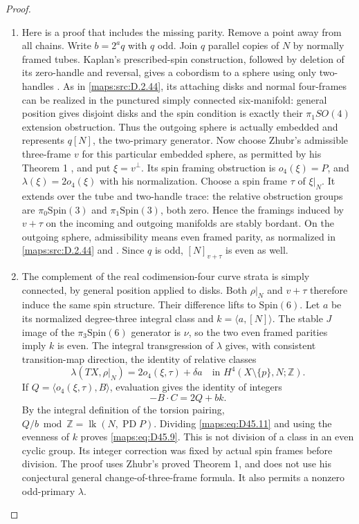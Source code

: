 \begin{proof}
\begin{enumerate}[label=\arabic*.,leftmargin=*]
\item Here is a proof that includes the missing parity. Remove a
point away from all chains. Write $b=2^a q$ with $q$ odd.
Join $q$ parallel copies of $N$ by normally framed tubes.
Kaplan's prescribed-spin construction, followed by deletion
of its zero-handle and reversal, gives a cobordism to a
sphere using only two-handles
\cite[Definition 1.7, Remark 1.8 and Theorem 3.1]{mapsKaplan79}.
As in \ref{maps:src:D.2.44}, its attaching disks and normal four-frames can
be realized in the punctured simply connected six-manifold:
general position gives disjoint disks and the spin condition
is exactly their $\pi_1SO(4)$ extension obstruction.
Thus the outgoing sphere is actually embedded and represents
$q[N]$, the two-primary generator.
Now choose Zhubr's admissible three-frame $v$ for this
particular embedded sphere, as permitted by his Theorem 1
\cite{ffZhubr13}, and put $\xi=v^\perp$. Its spin framing
obstruction is $o_4(\xi)=P$, and
$\lambda(\xi)=2o_4(\xi)$ with his normalization.
Choose a spin frame $\tau$ of $\xi|_N$.
It extends over the tube and two-handle trace: the relative
obstruction groups are $\pi_0\mathrm{Spin}(3)$ and
$\pi_1\mathrm{Spin}(3)$, both zero. Hence the framings
induced by $v+\tau$ on the incoming and outgoing manifolds
are stably bordant. On the outgoing sphere, admissibility
means even framed parity, as normalized in \ref{maps:src:D.2.44} and
\cite[Section 5]{ffZhubr13}. Since $q$ is odd,
$[N]_{v+\tau}$ is even as well.

\item The complement of the real codimension-four curve strata
is simply connected, by general position applied to disks.
Both $\rho|_N$ and $v+\tau$ therefore induce the same spin
structure. Their difference lifts to $\mathrm{Spin}(6)$.
Let $a$ be its normalized degree-three integral class and
$k=\langle a,[N]\rangle$. The stable $J$ image of the
$\pi_3\mathrm{Spin}(6)$ generator is $\nu$, so the two
even framed parities imply $k$ is even. The integral
transgression of $\lambda$ gives, with consistent
transition-map direction, the identity of relative classes
\[
 \lambda(TX,\rho|_N)=2o_4(\xi,\tau)+\delta a
                         \quad\text{in }H^4(X\setminus\{p\},N;\mathbb Z).
                                                               \tag{D45.10}\label{maps:eq:D45.10}
\]
If $Q=\langle o_4(\xi,\tau),B\rangle$, evaluation gives
the identity of integers
\[
                       -B\cdot C=2Q+bk.                    \tag{D45.11}\label{maps:eq:D45.11}
\]
By the integral definition of the torsion pairing,
$Q/b\bmod\mathbb Z=\operatorname{lk}(N,\operatorname{PD}P)$.
Dividing \eqref{maps:eq:D45.11} and using the evenness of $k$ proves
\eqref{maps:eq:D45.9}. This is not division of a class in an even cyclic
group. Its integer correction was fixed by actual spin
frames before division. The proof uses Zhubr's proved
Theorem 1, and does not use his conjectural general
change-of-three-frame formula. It also permits a nonzero
odd-primary $\lambda$.


\end{enumerate}
\end{proof}

